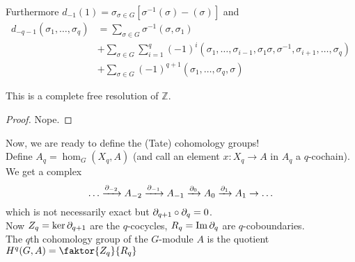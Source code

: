 \documentclass[../main.tex]{subfiles}
\begin{document}
Furthermore $d_{-1} ( 1) = \sigma_{\sigma\in G} [ \sigma^{-1}( \sigma) -( \sigma) ] $ and
\begin{align*}
	d_{-q-1} ( \sigma_1,\ldots,\sigma_q) &= \sum_{\sigma\in G}^{ } \sigma^{-1} ( \sigma,\sigma_1)\\
					     &+ \sum_{\sigma\in G}^{ } \sum_{i=1}^{ q} ( -1)^{i }( \sigma_1,\ldots,\sigma_{i-1} ,\sigma_1\sigma,\sigma^{-1},\sigma_{i+1} ,\ldots,\sigma_q)\\
					     &+ \sum_{\sigma\in G}^{ } ( -1)^{q+1 }( \sigma_1,\ldots,\sigma_q,\sigma) 
\end{align*}
\begin{lemma}
This is a complete free resolution of $ \mathbb{Z}$.
\end{lemma}
\begin{proof}
Nope.
\end{proof}
Now, we are ready to define the (Tate) cohomology groups!\\
Define $A_q= \hom_G( X_q, A) $ (and call an element $x:X_q \to A$ in $A_q$ a $q$-cochain).\\
We get a complex
\[ 
	\ldots \xrightarrow{\partial_{-2} } A_{-2} \xrightarrow{\partial_{-1} } A_{-1} \xrightarrow{\partial_0} A_0 \xrightarrow{\partial_1} A_1\to \ldots
\]
which is not necessarily exact but $\partial_{q+1} \circ\partial_q = 0$.\\
Now $Z_q= \ker\partial_{q+1} $ are the $q$-cocycles, $R_q= \operatorname{Im}\partial_q$ are $q$-coboundaries.\\
The $q$th cohomology group of the $G$-module $A$ is the quotient $H^{q}(G,A ) = \faktor{Z_q}{R_q} $ 
\end{document}
